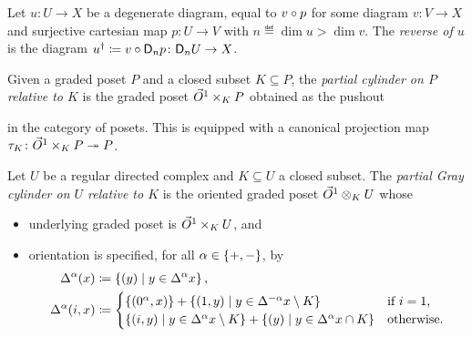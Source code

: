 \begin{dfn} 
    Let \( u \colon U \to X \) be a degenerate diagram, equal to \( v \circ p \) for some diagram \( v \colon V \to X \) and surjective cartesian map \( p \colon U \to V \) with \( n \eqdef \dim u > \dim v \).
    The \emph{reverse of \( u \)} is the diagram \( {u}^\dag \coloneqq v \circ \mathsf{D}_{n}{p} \colon \mathsf{D}_{n}{U} \to X \).
\end{dfn}

\begin{dfn}
    Given a graded poset \( P \) and a closed subset \( K \subseteq P \), the \emph{partial cylinder on \( P \) relative to \( K \)} is the graded poset \( \vec{O}^{1} \times_K P \) obtained as the pushout
    \begin{center}
    \end{center}
    in the category of posets.
    This is equipped with a canonical projection map \( \tau_K \colon \vec{O}^{1} \times_K P \twoheadrightarrow P \).
\end{dfn}

\begin{dfn}
	Let \( U \) be a regular directed complex and \( K \subseteq U \) a closed subset.
	The \emph{partial Gray cylinder on \( U \) relative to \( K \)} is the oriented graded poset \( \vec{O}^{1} \otimes_K U \) whose
    \begin{itemize}
        \item underlying graded poset is \( \vec{O}^{1} \times_K U \), and
        \item orientation is specified, for all \( \alpha \in \left\{ {+, -} \right\} \), by
        \begin{align*}
            \Delta_{}^{\alpha}(x) & \coloneqq \left\{ {(y) \mid y \in \Delta_{}^{\alpha}x} \right\}, \\
            \Delta_{}^{\alpha}(i, x) & \coloneqq \begin{cases}
                \left\{ {(0^\alpha, x)} \right\} + \left\{ {(1, y) \mid y \in \Delta_{}^{-\alpha}x \setminus K} \right\} &
                \text{if \( i = 1 \),} \\
                \left\{ {(i, y) \mid y \in \Delta_{}^{\alpha}x \setminus K} \right\} + 
                \left\{ {(y) \mid y \in \Delta_{}^{\alpha}x \cap K} \right\} &
                \text{otherwise}.
            \end{cases}
        \end{align*}
    \end{itemize}
\end{dfn}


